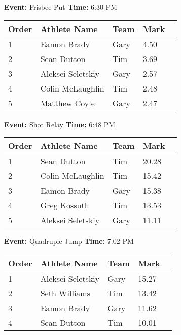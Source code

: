 \documentclass[10pt]{article}
\begin{document}
\textbf{Event:} Frisbee Put \quad \textbf{Time:} 6:30 PM 

\vspace{1em}
\begin{tabular}{@{}lllll@{}}
\toprule

\textbf{Order} & \textbf{Athlete Name} & \textbf{Team} & \textbf{Mark} \\
\midrule
1 & Eamon Brady & Gary & 4.50 &\\
2 & Sean Dutton & Tim & 3.69 &\\
3 & Aleksei Seletskiy & Gary & 2.57 &\\
4 & Colin McLaughlin & Tim & 2.48 &\\
5 & Matthew Coyle & Gary & 2.47 &\\
\bottomrule
\end{tabular}
\vspace{2.5em}


\textbf{Event:} Shot Relay \quad \textbf{Time:} 6:48 PM 

\vspace{1em}
\begin{tabular}{@{}lllll@{}}
\toprule

\textbf{Order} & \textbf{Athlete Name} & \textbf{Team} & \textbf{Mark} \\
\midrule
1 & Sean Dutton & Tim & 20.28 &\\
2 & Colin McLaughlin & Tim & 15.42 &\\
3 & Eamon Brady & Gary & 15.38 &\\
4 & Greg Kossuth & Tim & 13.53 &\\
5 & Aleksei Seletskiy & Gary & 11.11 &\\
\bottomrule
\end{tabular}
\vspace{2.5em}


\textbf{Event:} Quadruple Jump \quad \textbf{Time:} 7:02 PM 

\vspace{1em}
\begin{tabular}{@{}lllll@{}}
\toprule

\textbf{Order} & \textbf{Athlete Name} & \textbf{Team} & \textbf{Mark} \\
\midrule
1 & Aleksei Seletskiy & Gary & 15.27 &\\
2 & Seth Williams & Tim & 13.42 &\\
3 & Eamon Brady & Gary & 11.62 &\\
4 & Sean Dutton & Tim & 10.01 &\\
\bottomrule
\end{tabular}
\vspace{2.5em}
\end{document}

